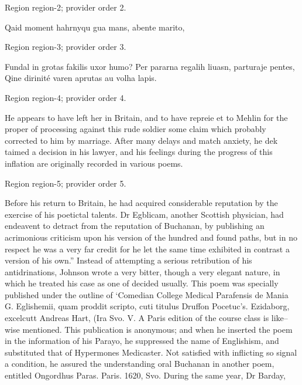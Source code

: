 \documentclass[11pt]{article}
\begin{document}
{\scriptsize\color{gray} Region region-2; provider order 2.\par}
\medskip

Qaid moment hahrnyqu gua mans, abente marito,
\par

{\scriptsize\color{gray} Region region-3; provider order 3.\par}
\medskip

Fundal in grotas fakilis uxor humo? Per pararna regalih liuasn, parturaje pentes, Qine dirinité varen aprutas au volha lapis.
\par

{\scriptsize\color{gray} Region region-4; provider order 4.\par}
\medskip

He appears to have left her in Britain, and to have repreie et to Mehlin for the proper of processing against this rude soldier some claim which probably corrected to him by marriage. After many delays and match anxiety, he dek taimed a decision in his lawyer, and his feelings during the progress of this inflation are originally recorded in various poems.
\par

{\scriptsize\color{gray} Region region-5; provider order 5.\par}
\medskip

Before his return to Britain, he had acquired considerable reputation by the exercise of his poetictal talents. Dr Egblicam, another Scottish physician, had endeavent to detract from the reputation of Buchanan, by publishing an acrimonious criticism upon his version of the hundred and found paths, but in no respect he was a very far credit for he let the same time exhibited in contrast a version of his own.” Instead of attempting a serious retribution of his antidrinations, Johnson wrote a very bitter, though a very elegant nature, in which he treated his case as one of decided usually. This poem was specially published under the outline of ‘Comedian College Medical Parafensis de Mania G. Eglishemii, quam proddit scripto, cuti titulus Druffon Pocetuc’s. Ezidaborg, excelcutt Andreas Hart, (Ira Svo. V. A Paris edition of the course class is like–wise mentioned. This publication is anonymous; and when he inserted the poem in the information of his Parayo, he suppressed the name of Englishism, and substituted that of Hypermones Medicaster. Not satisfied with inflicting so signal a condition, he assured the understanding oral Buchanan in another poem, entitled Ongordhus Paras. Paris. 1620, Svo. During the same year, Dr Barday,
\par
\end{document}
